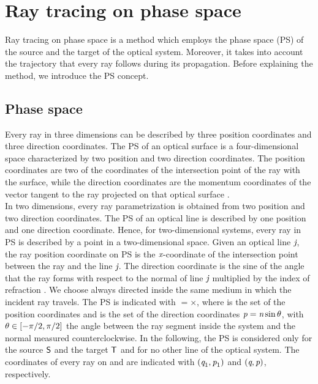 \chapter{Ray tracing on phase space} \label{chap:PS}
Ray tracing on phase space is a method which employs the phase space (PS) of the source and the target of the optical system.
Moreover, it takes into account the trajectory that every ray follows during its propagation.
Before explaining the method, we introduce the PS concept.
\section{Phase space}\label{sec:PSconcept}
Every ray in three dimensions can be described by three position coordinates and three direction coordinates. 
The PS of an optical surface is a four-dimensional space characterized by two position and two direction coordinates. The position coordinates are two of the coordinates of the intersection point of the ray with the surface, while the direction coordinates are the momentum coordinates of the vector tangent to the ray projected on that optical surface \cite{wolf2004geometric}.
\\ \indent 
In two dimensions, every ray parametrization is obtained from two position and two direction coordinates. The PS of an optical line is described by one position and one direction coordinate. Hence, for two-dimensional systems, every ray in PS is described by a point in a two-dimensional space.
Given an optical line $\textit{j}$, the ray position coordinate on PS is the $\textit{x}$-coordinate of the intersection point between the ray and the line $\textit{j}$. The direction coordinate is the sine of the angle that the ray forms with respect to the normal \vect{$\boldsymbol{\nu}$} of line $\textit{j}$ multiplied by the index of refraction \n. We choose \vect{$\boldsymbol{\nu}$} always directed inside the same medium in which the incident ray travels. The PS is indicated with $=$$\times$,
where  is the set of the position coordinates  and  is the set of the direction coordinates $\textit{p}=\textit{n}\sin{\theta}$, with $\theta\in[-\pi/2, \pi/2]$ the angle between the ray segment inside the system and the normal measured counterclockwise.
In the following, the PS is considered only for the source $\textsf{S}$ and the target $\textsf{T}$ and for no other line of the optical system.
The coordinates of every ray on  and  are indicated with $(\textit{q}_1,\textit{p}_1)$ and $(\textit{q},\textit{p})$, respectively.\\ \indent
